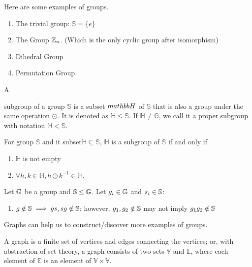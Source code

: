 \documentclass[../note.tex]{subfiles}
\begin{document}
Here are some examples of groups. 
\begin{enumerate}
	\item The trivial group: $\mathbb{S}=\{e\}$
	\item The Group $\mathbb{Z}_n$. (Which is the only cyclic group after isomorphism)
	\item Dihedral Group 
	\item Permutation Group
\end{enumerate}

\begin{definition}[Subgroup]
	\hypertarget{def:subgroup}{A} subgroup of a group $\mathbb{S}$ is a subset $\\mathbb{H}$ of $\mathbb{S}$ that is also a group under the same operation $\odot$. It is denoted as $ \mathbb{H}\leq \mathbb{S}$. If $\mathbb{H} \neq \mathbb{G}$, we call it a proper subgroup with notation $\mathbb{H}< \mathbb{S}$.
\end{definition}

\begin{theorem} 
	For group $\mathbb{S}$ and it subset$\mathbb{H} \subseteq \mathbb{S}$, $\mathbb{H}$ is a subgroup of $\mathbb{S}$ if and only if 
	\begin{enumerate}
		\item $\mathbb{H}$ is not empty 
		\item $\forall h,k \in \mathbb{H}, h\odot k^{-1} \in \mathbb{H}$.
	\end{enumerate}
\end{theorem}

\begin{theorem} 
	Let $\mathbb{G}$ be a group and $\mathbb{S}\leq \mathbb{G}$. Let $g_i\in \mathbb{G}$ and $s_i \in \mathbb{S}$:
	\begin{enumerate}
		\item $g\notin \mathbb{S} \implies gs, sg \notin \mathbb{S}$; however, $g_1, g_2 \notin \mathbb{S}$ may not imply $g_1g_2 \notin \mathbb{S}$
	\end{enumerate}
\end{theorem}

Graphs can help us to construct/discover more examples of groups.

\begin{definition}[Graph]
	A graph is a finite set of vertices and edges connecting the vertices;
	or, with abstraction of set theory, a graph consists of two sets $\mathbb{V}$ and $\mathbb{E}$, where each element of $\mathbb{E}$ is an element of $\mathbb{V}\times \mathbb{V}.$
\end{definition}
\end{document}
